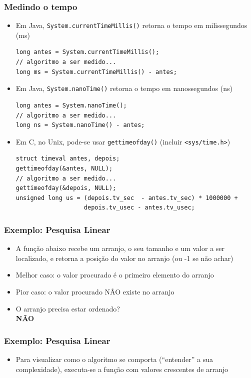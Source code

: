 \documentclass[aspectratio=169]{beamer}
\begin{document}
\begin{frame}[fragile]\frametitle{Medindo o tempo}
\begin{itemize}
	\item Em Java, \texttt{System.currentTimeMillis()} retorna o tempo em milissegundos (ms)
{\scriptsize
\begin{lstlisting}
long antes = System.currentTimeMillis();
// algoritmo a ser medido...
long ms = System.currentTimeMillis() - antes;
\end{lstlisting}}
	\item Em Java, \texttt{System.nanoTime()} retorna o tempo em nanossegundos (ns)
{\scriptsize
\begin{lstlisting}
long antes = System.nanoTime();
// algoritmo a ser medido...
long ns = System.nanoTime() - antes;
\end{lstlisting}}
	\item Em C, no Unix, pode-se usar \texttt{gettimeofday()} (incluir \texttt{<sys/time.h>})
{\scriptsize\begin{lstlisting}
struct timeval antes, depois;
gettimeofday(&antes, NULL);
// algoritmo a ser medido...
gettimeofday(&depois, NULL);
unsigned long us = (depois.tv_sec  - antes.tv_sec) * 1000000 +
                   depois.tv_usec - antes.tv_usec;
\end{lstlisting}}

\end{itemize}
\end{frame}

\begin{frame}[fragile]\frametitle{Exemplo: Pesquisa Linear}
\begin{itemize}
	\item A função abaixo recebe um arranjo, o seu tamanho e um valor a ser localizado, e retorna a posição do valor no arranjo (ou -1 se não achar)
{\small}
	\item Melhor caso: o valor procurado é o primeiro elemento do arranjo
	\item Pior caso: o valor procurado NÃO existe no arranjo
	\item O arranjo precisa estar ordenado?\\
	\pause
	\textbf{NÃO}
\end{itemize}
\end{frame}

\begin{frame}[fragile]\frametitle{Exemplo: Pesquisa Linear}
\begin{itemize}
	\item Para visualizar como o algoritmo se comporta (``entender'' a sua complexidade), executa-se a função com valores crescentes de arranjo
{\fontsize{0}{5.5}\selectfont}
\end{itemize}
\end{frame}
\end{document}

